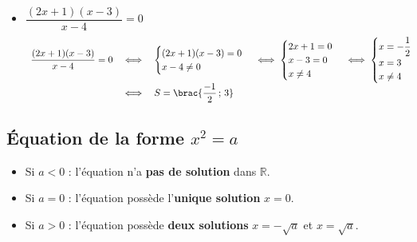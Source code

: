 \begin{methode}
\begin{correction}
\begin{itemize}
			\item $\dfrac{(2x+1)(x-3)}{x-4} = 0$
			      \[
				      \begin{array}{rcl}
					      \dfrac{(2x+1)(x-3)}{x-4} = 0 & \iff & \begin{cases}
						                                            (2x + 1)(x - 3) = 0 \\
						                                            x - 4 \neq 0
					                                            \end{cases} \iff \begin{cases}
						                                                             2x + 1 = 0 \\
						                                                             x - 3 = 0  \\
						                                                             x \neq 4
					                                                             \end{cases} \iff \begin{cases}
						                                                                              x = -\dfrac{1}{2} \\
						                                                                              x = 3             \\
						                                                                              x \neq 4
					                                                                              \end{cases} \\ %
					                                   & \iff & S = \brac{\dfrac{-1}{2} \,;\, 3}
				      \end{array}
			      \]
		\end{itemize}
	\end{correction}
\end{methode}

\subsection{Équation de la forme $x^2 = a$}

\begin{prop}[Solutions de $x^2 = a$]
	\nline
	\begin{itemize}
		\item Si $a < 0$ : l'équation n'a \textbf{pas de solution} dans $\mathbb{R}$.
		\item Si $a = 0$ : l'équation possède l'\textbf{unique solution} $x = 0$.
		\item Si $a > 0$ : l'équation possède \textbf{deux solutions} $x = -\sqrt{a}$ et $x = \sqrt{a}$.
	\end{itemize}
\end{prop}

